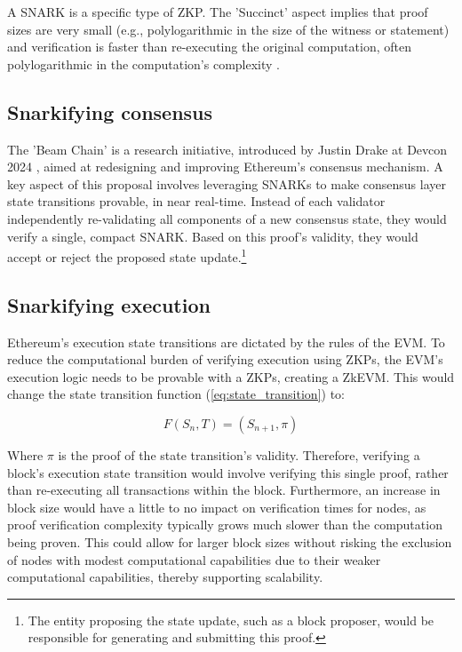 A SNARK is a specific type of ZKP. The 'Succinct' aspect implies that proof
sizes are very small (e.g., polylogarithmic in the size of the witness or
statement) and verification is faster than re-executing the original
computation, often polylogarithmic in the computation's complexity \cite{BCCT11}.

\subsection{Snarkifying consensus}

The 'Beam Chain' is a research initiative, introduced by Justin Drake at Devcon
2024 \cite{JustinDrakeBeamchain}, aimed at redesigning and improving
Ethereum's consensus mechanism. A key aspect of this proposal involves
leveraging SNARKs to make consensus layer state transitions provable, in near
real-time. Instead of each validator independently re-validating all
components of a new consensus state, they would verify a single, compact
SNARK. Based on this proof's validity, they would accept or
reject the proposed state update.\footnote{The entity proposing the state
update, such as a block proposer, would be responsible for generating and
submitting this proof.}

\subsection{Snarkifying execution}\label{subsec:snarkifying_execution}

Ethereum's execution state transitions are dictated by the rules of the
EVM. To reduce the computational burden of verifying execution using ZKPs, the
EVM's execution logic needs to be provable with a ZKPs, creating a ZkEVM. This
would change the state transition function (\ref{eq:state_transition}) to:

\[
	F(S_n, T) = (S_{n+1}, \pi)
\]

Where $\pi$ is the proof of the state transition's validity. Therefore,
verifying a block's execution state transition would involve verifying this
single proof, rather than re-executing all transactions within the block.
Furthermore, an increase in block size would have a little to no impact on
verification times for nodes, as proof verification complexity typically grows
much slower than the computation being proven. This could allow for larger
block sizes without risking the exclusion of nodes with modest computational
capabilities due to their weaker computational capabilities, thereby
supporting scalability.

